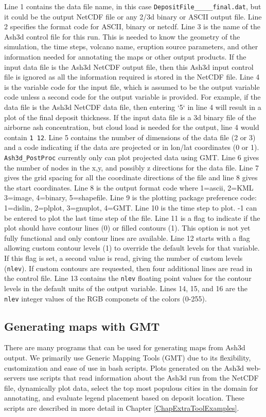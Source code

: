 Line 1 contains the data file name, in this case
\texttt{DepositFile\_\_\_\_\_final.dat}, but it could be
the output NetCDF file or any 2/3d binary or ASCII output file.
Line 2 specifies the format code for ASCII, binary or netcdf.
Line 3 is the name of the Ash3d control file for this run. This is needed to know the geometry
of the simulation, the time steps, volcano name, eruption source parameters, and
other information needed for annotating the maps or other output products. If the
input data file is the Ash3d NetCDF output file, then this Ash3d input control file
is ignored as all the information required is stored in the NetCDF file.
Line 4 is the variable code for the input file, which is assumed to be the output
variable code unless a second code for the output variable is provided. For example, if
the data file is the Ash3d NetCDF data file, then entering `5` in line 4 will result
in a plot of the final deposit thickness. If the input data file is a 3d binary
file of the airborne ash concentration, but cloud load is needed for the output, line
4 would contain \texttt{1 12}.
Line 5 contains the number of dimensions of the data file (2 or 3) and a code indicating if
the data are projected or in lon/lat coordinates (0 or 1). \texttt{Ash3d\_PostProc} currently
only can plot projected data using GMT.
Line 6 gives the number of nodes in the x,y, and possibly z directions for the data file.
Line 7 gives the grid spacing for all the coordinate directions of the file and line 8
gives the start coordinates.
Line 8 is the output format code where 1=ascii, 2=KML 3=image, 4=binary, 5=shapefile.
Line 9 is the plotting package preference code: 1=dislin, 2=plplot, 3=gnuplot, 4=GMT.
Line 10 is the time step to plot. -1 can be entered to plot the last time step of the
file.
Line 11 is a flag to indicate if the plot should have contour lines (0) or filled contours (1).
This option is not yet fully functional and only contour lines are available.
Line 12 starts with a flag allowing custom contour levels (1) to override the default
levels for that variable. If this flag is set, a second value is read, giving the
number of custom levels (\texttt{nlev}).
If custom contours are requested, then four additional lines are read in the control file.
Line 13 contains the \texttt{nlev} floating point values for the contour levels in the
default units of the output variable.
Lines 14, 15, and 16 are the \texttt{nlev} integer values of the RGB componets of the colors (0-255).

\subsection{Generating maps with GMT}\label{ChapUsageSecPostProcGMT}
There are many programs that can be used for generating maps from Ash3d output. We primarily
use Generic Mapping Tools (GMT) due to its flexibility, customization and ease of use in
bash scripts. Plots generated on the Ash3d web-servers use scripts that read information
about the Ash3d run from the NetCDF file, dynamically plot data, select the top most populous
cities in the domain for annotating, and evaluate legend placement based on deposit location.
These scripts are described in more detail in Chapter \ref{ChapExtraToolExamples}.

